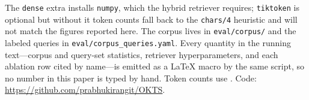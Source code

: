 \documentclass[11pt]{article}
\begin{document}
The \texttt{dense} extra installs \texttt{numpy}, which the hybrid retriever
requires; \texttt{tiktoken} is optional but without it token counts fall back to
the \texttt{chars/4} heuristic and will not match the figures reported here. The
corpus lives in \texttt{eval/corpus/} and the labeled queries in
\texttt{eval/corpus\_queries.yaml}. Every quantity in the running text---corpus
and query-set statistics, retriever hyperparameters, and each ablation row cited
by name---is emitted as a \LaTeX{} macro by the same script, so no number in this
paper is typed by hand. Token counts use \tokenizerName. Code:
\url{https://github.com/prabhukirangit/OKTS}.



\end{document}
